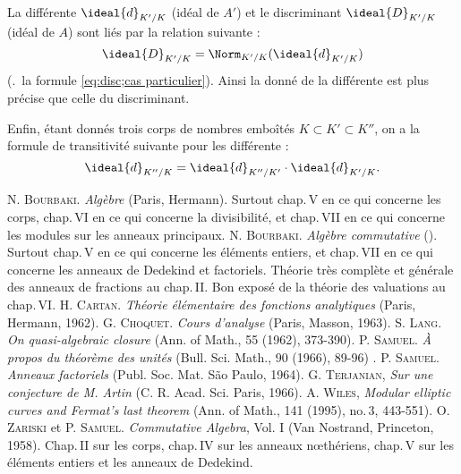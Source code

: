 \documentclass[11pt, useosf,
  title in boldface,
  theorem in new line,
  theorem numbering = section,
  number theorems separately,
]{simplivre}
\begin{document}
    La différente \( \ideal{d}_{K'/K} \) (idéal de \( A' \)) et le discriminant \( \ideal{D}_{K'/K} \) (idéal de \( A \)) sont liés par la relation suivante :
    \begin{equation}
        \ideal{D}_{K'/K} = \Norm_{K'/K}(\ideal{d}_{K'/K})
    \end{equation}
    (\cf.~la formule \eqref{eq:disc;cas particulier}). Ainsi la donné de la différente est plus précise que celle du discriminant.

    Enfin, étant donnés trois corps de nombres emboîtés \( K \subset K' \subset K'' \), on a la formule de transitivité suivante pour les différente :
    \begin{equation}
        \ideal{d}_{K''/K} = \ideal{d}_{K''/K'} \cdot \ideal{d}_{K'/K}.
    \end{equation}


\backmatter

{}
\begin{thebibliography}{}
    \thispagestyle{plain}
     \textsc{N. Bourbaki}. \textit{Algèbre} (Paris, Hermann). Surtout chap.\,V en ce qui concerne les corps, chap.\,VI en ce qui concerne la divisibilité, et chap.\,VII en ce qui concerne les modules sur les anneaux principaux.
     \textsc{N. Bourbaki}. \textit{Algèbre commutative} (\ibid). Surtout chap.\,V en ce qui concerne les éléments entiers, et chap.\,VII en ce qui concerne les anneaux de Dedekind et factoriels. Théorie très complète et générale des anneaux de fractions au chap.\,II. Bon exposé de la théorie des valuations au chap.\,VI.
     \textsc{H. Cartan}. \textit{Théorie élémentaire des fonctions analytiques} (Paris, Hermann, 1962).
     \textsc{G. Choquet}. \textit{Cours d'analyse} (Paris, Masson, 1963).
     \textsc{S. Lang}. \textit{On quasi-algebraic closure} (Ann. of Math., 55 (1962), 373-390).
     \textsc{P. Samuel}. \textit{À propos du théorème des unités} (Bull. Sci. Math., 90 (1966), 89-96) .
     \textsc{P. Samuel}. \textit{Anneaux factoriels} (Publ. Soc. Mat. São Paulo, 1964).
     \textsc{G. Terjanian}, \textit{Sur une conjecture de M. Artin} (C. R. Acad. Sci. Paris, 1966).
     \textsc{A. Wiles}, \textit{Modular elliptic curves and Fermat's last theorem} (Ann. of Math., 141 (1995), no.\,3, 443-551).
     \textsc{O. Zariski} et \textsc{P. Samuel}. \textit{Commutative Algebra}, Vol. I (Van Nostrand, Princeton, 1958). Chap.\,II sur les corps, chap.\,IV sur les anneaux nœthériens, chap.\,V sur les éléments entiers et les anneaux de Dedekind.
\end{thebibliography}
\end{document}

